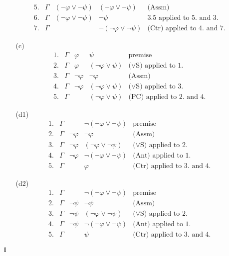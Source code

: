 \begin{enumerate}[1.]
\begin{itemize}
\[\begin{array}{lllll}
5. & \Gamma & (\neg \varphi \lor \neg \psi) & (\neg \varphi \lor \neg \psi) & \mbox{(Assm)} \\
6. & \Gamma & (\neg \varphi \lor \neg \psi) & \neg \psi & \mbox{3.5 applied to 5. and 3.} \\
7. & \Gamma & \, & \neg (\neg \varphi \lor \neg \psi) & \mbox{(Ctr) applied to 4. and 7.}
\end{array}
\]
\item[(c)]
\[
\begin{array}{lllll}
1. & \Gamma & \varphi & \psi & \mbox{premise} \\
2. & \Gamma & \varphi & (\neg \varphi \lor \psi) & \mbox{($\lor$S) applied to 1.} \\
3. & \Gamma & \neg \varphi & \neg \varphi & \mbox{(Assm)} \\
4. & \Gamma & \neg \varphi & (\neg \varphi \lor \psi) & \mbox{($\lor$S) applied to 3.} \\
5. & \Gamma & \, & (\neg \varphi \lor \psi) & \mbox{(PC) applied to 2. and 4.}
\end{array}
\]
\item[(d1)]
\[
\begin{array}{lllll}
1. & \Gamma & \, & \neg (\neg \varphi \lor \neg \psi) & \mbox{premise} \\
2. & \Gamma & \neg \varphi & \neg \varphi & \mbox{(Assm)} \\
3. & \Gamma & \neg \varphi & (\neg \varphi \lor \neg \psi) & \mbox{($\lor$S) applied to 2.} \\
4. & \Gamma & \neg \varphi & \neg (\neg \varphi \lor \neg \psi) & \mbox{(Ant) applied to 1.} \\
5. & \Gamma & \, & \varphi & \mbox{(Ctr) applied to 3. and 4.}
\end{array}
\]
\item[(d2)]
\[
\begin{array}{lllll}
1. & \Gamma & \, & \neg (\neg \varphi \lor \neg \psi) & \mbox{premise} \\
2. & \Gamma & \neg \psi & \neg \psi & \mbox{(Assm)} \\
3. & \Gamma & \neg \psi & (\neg \varphi \lor \neg \psi) & \mbox{($\lor$S) applied to 2.} \\
4. & \Gamma & \neg \psi & \neg (\neg \varphi \lor \neg \psi) & \mbox{(Ant) applied to 1.} \\
5. & \Gamma & \, & \psi & \mbox{(Ctr) applied to 3. and 4.}
\end{array}
\]
\end{itemize} \begin{flushright}$\talloblong$\end{flushright}

\end{enumerate}
